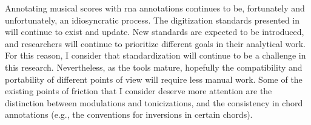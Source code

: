 
Annotating musical scores with \gls{rna} annotations
continues to be, fortunately and unfortunately, an
idiosyncratic process. The digitization standards presented
in  will continue to exist and
update. New standards are expected to be introduced, and
researchers will continue to prioritize different goals in
their analytical work. For this reason, I consider that
standardization will continue to be a challenge in this
research. Nevertheless, as the tools mature, hopefully the
compatibility and portability of different points of view
will require less manual work. Some of the existing points
of friction that I consider deserve more attention are the
distinction between modulations and tonicizations, and the
consistency in chord annotations (e.g., the conventions for
inversions in certain chords).
